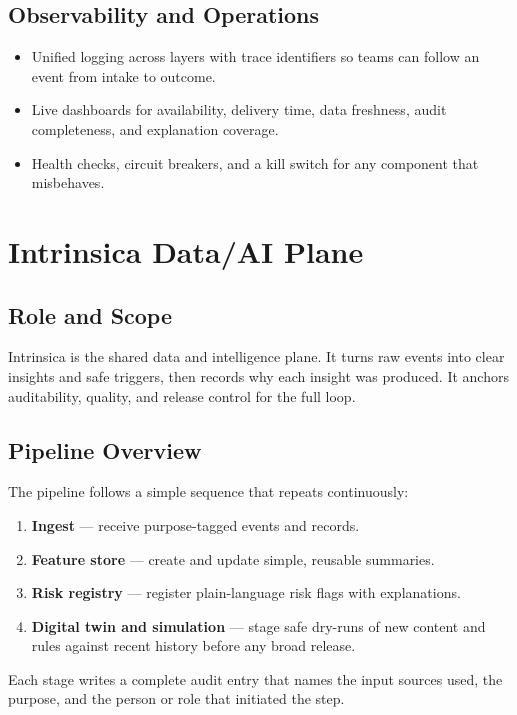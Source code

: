 \documentclass[12pt]{article}
\begin{document}
\subsection*{Observability and Operations}
\begin{itemize}[leftmargin=*]
  \item Unified logging across layers with trace identifiers so teams can follow an event from intake to outcome.
  \item Live dashboards for availability, delivery time, data freshness, audit completeness, and explanation coverage.
  \item Health checks, circuit breakers, and a kill switch for any component that misbehaves.
\end{itemize}


\section{Intrinsica Data/AI Plane}

\subsection*{Role and Scope}
Intrinsica is the shared data and intelligence plane. It turns raw events into clear insights and safe triggers, then records why each insight was produced. It anchors auditability, quality, and release control for the full loop.

\subsection*{Pipeline Overview}
The pipeline follows a simple sequence that repeats continuously:
\begin{enumerate}[leftmargin=*]
  \item \textbf{Ingest} — receive purpose-tagged events and records.
  \item \textbf{Feature store} — create and update simple, reusable summaries.
  \item \textbf{Risk registry} — register plain-language risk flags with explanations.
  \item \textbf{Digital twin and simulation} — stage safe dry-runs of new content and rules against recent history before any broad release.
\end{enumerate}
Each stage writes a complete audit entry that names the input sources used, the purpose, and the person or role that initiated the step.
\end{document}
